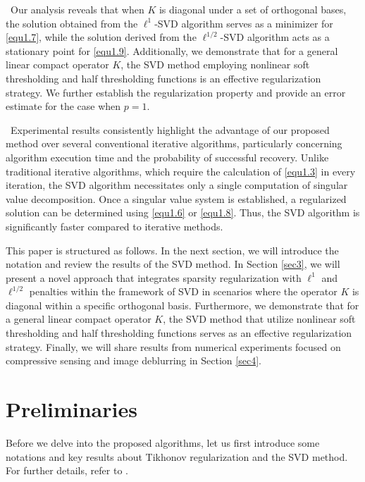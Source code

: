 \documentclass[a4paper,12pt]{article}
\numberwithin{equation}{section}
\begin{document}
\textbullet\ Our analysis reveals that when $K$ is diagonal under a set of orthogonal bases, the solution obtained from the $\ell^{1}$-SVD algorithm serves as a minimizer for \eqref{equ1.7}, while the solution derived from the $\ell^{1/2}$-SVD algorithm acts as a stationary point for \eqref{equ1.9}. Additionally, we demonstrate that for a general linear compact operator $K$, the SVD method employing nonlinear soft thresholding and half thresholding functions is an effective regularization strategy. We further establish the regularization property and provide an error estimate for the case when $p=1$.

\textbullet\ Experimental results consistently highlight the advantage of our proposed method over several conventional iterative algorithms, particularly concerning algorithm execution time and the probability of successful recovery. Unlike traditional iterative algorithms, which require the calculation of \eqref{equ1.3} in every iteration, the SVD algorithm necessitates only a single computation of singular value decomposition. Once a singular value system is established, a regularized solution can be determined using \eqref{equ1.6} or \eqref{equ1.8}. Thus, the SVD algorithm is significantly faster compared to iterative methods.

\par This paper is structured as follows. In the next section, we will introduce the notation and review the results of the SVD method. In Section \ref{sec3}, we will present a novel approach that integrates sparsity regularization with $\ell^{1}$ and $\ell^{1/2}$ penalties within the framework of SVD in scenarios where the operator $K$ is diagonal within a specific orthogonal basis. Furthermore, we demonstrate that for a general linear compact operator $K$, the SVD method that utilize nonlinear soft thresholding and half thresholding functions serves as an effective regularization strategy. Finally, we will share results from numerical experiments focused on compressive sensing and image deblurring in Section \ref{sec4}.

\section{Preliminaries}\label{sec2}

Before we delve into the proposed algorithms, let us first introduce some notations and key results about Tikhonov regularization and the SVD method. For further details, refer to \cite{DDD04,EHN1996,K1996}. 
\end{document}
